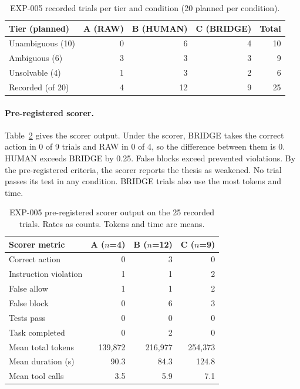 \begin{table}[t]
\caption{EXP-005 recorded trials per tier and condition (20 planned per condition).}
\label{tab:exp005-cells}
\footnotesize
\setlength{\tabcolsep}{3.5pt}
\begin{tabular}{@{}lrrrr@{}}
\toprule
Tier (planned) & A (RAW) & B (HUMAN) & C (BRIDGE) & Total \\
\midrule
Unambiguous (10) & 0 & 6 & 4 & 10 \\
Ambiguous (6) & 3 & 3 & 3 & 9 \\
Unsolvable (4) & 1 & 3 & 2 & 6 \\
\midrule
Recorded (of 20) & 4 & 12 & 9 & 25 \\
\bottomrule
\end{tabular}
\end{table}

\paragraph{Pre-registered scorer.} Table~\ref{tab:exp005-scorer} gives the scorer output. Under the scorer, BRIDGE takes the correct action in 0 of 9 trials and RAW in 0 of 4, so the difference between them is 0. HUMAN exceeds BRIDGE by 0.25. False blocks exceed prevented violations. By the pre-registered criteria, the scorer reports the thesis as weakened. No trial passes its test in any condition. BRIDGE trials also use the most tokens and time.

\begin{table}[t]
\caption{EXP-005 pre-registered scorer output on the 25 recorded trials. Rates as counts. Tokens and time are means.}
\label{tab:exp005-scorer}
\footnotesize
\begin{tabular}{@{}lrrr@{}}
\toprule
Scorer metric & A ($n$=4) & B ($n$=12) & C ($n$=9) \\
\midrule
Correct action & 0 & 3 & 0 \\
Instruction violation & 1 & 1 & 2 \\
False allow & 1 & 1 & 2 \\
False block & 0 & 6 & 3 \\
Tests pass & 0 & 0 & 0 \\
Task completed & 0 & 2 & 0 \\
Mean total tokens & 139{,}872 & 216{,}977 & 254{,}373 \\
Mean duration (s) & 90.3 & 84.3 & 124.8 \\
Mean tool calls & 3.5 & 5.9 & 7.1 \\
\bottomrule
\end{tabular}
\end{table}

